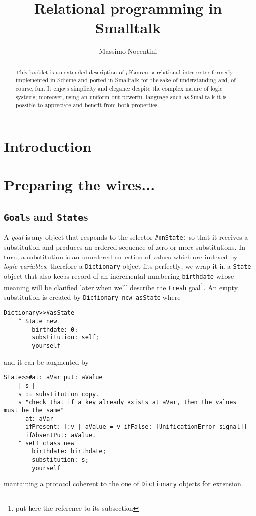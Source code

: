 \documentclass[a4paper,12pt]{article}
\author{Massimo Nocentini}
\title{Relational programming in Smalltalk}
\newcommand{\stcode}[1]{\texttt{#1}}
\begin{document}
\maketitle

\begin{abstract}
This booklet is an extended description of $\mu$Kanren, a relational
interpreter formerly implemented in Scheme and ported in Smalltalk for the sake
of understanding and, of course, fun. It enjoys simplicity and elegance despite
the complex nature of logic systems; moreover, using an uniform but powerful
language such as Smalltalk it is possible to appreciate and benefit from both
properties.
\end{abstract}

\section*{Introduction}



\tableofcontents

\section{Preparing the wires...}

\subsection{\texttt{Goal}s and \texttt{State}s}

A \textit{goal} is any object that responds to the selector \Verb|#onState:| so
that it receives a substitution and produces an ordered sequence of zero or
more substitutions. In turn, a substitution is an unordered collection of
values which are indexed by \textit{logic variables}, therefore a
\Verb|Dictionary| object fits perfectly; we wrap it in a \Verb|State| object
that also keeps record of an incremental numbering \Verb|birthdate| whose
meaning will be clarified later when we'll describe the \Verb|Fresh|
goal\footnote{put here the reference to its subsection}. An empty substitution
is created by \stcode{Dictionary new asState} where
\begin{verbatim}
Dictionary>>#asState
    ^ State new
        birthdate: 0;
        substitution: self;
        yourself
\end{verbatim}
and it can be augmented by
\begin{verbatim}
State>>#at: aVar put: aValue
    | s |
    s := substitution copy.
    s "check that if a key already exists at aVar, then the values must be the same"
      at: aVar
      ifPresent: [:v | aValue = v ifFalse: [UnificationError signal]]
      ifAbsentPut: aValue.
    ^ self class new
        birthdate: birthdate;
        substitution: s;
        yourself
\end{verbatim}
mantaining a protocol coherent to the one of \Verb|Dictionary| objects for
extension.
\end{document}
